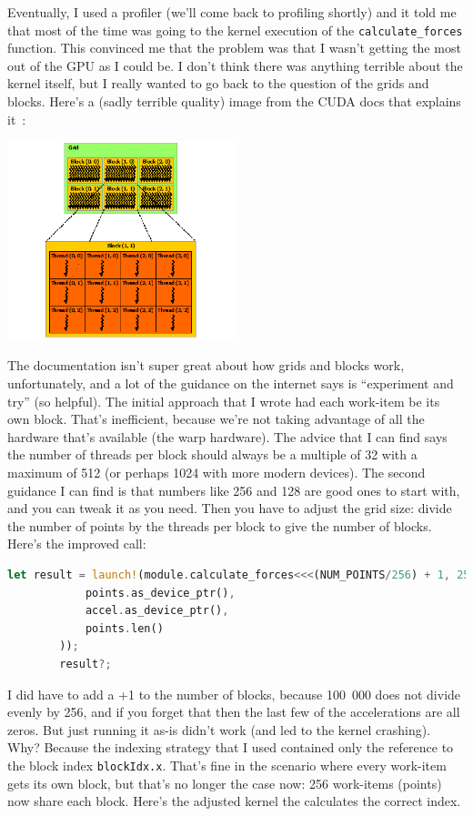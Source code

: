 \documentclass[a4paper]{report}
\begin{document}
Eventually, I used a profiler (we'll come back to profiling shortly) and it told me that most of the time was going to the kernel execution of the \texttt{calculate\_forces} function. This convinced me that the problem was that I wasn't getting the most out of the GPU as I could be. I don't think there was anything terrible about the kernel itself, but I really wanted to go back to the question of the grids and blocks. Here's a (sadly terrible quality) image from the CUDA docs that explains it~\cite{cuda}:
\begin{center}
	\includegraphics[width=0.5\textwidth]{images/grid-of-thread-blocks.png}
\end{center}

The documentation isn't super great about how grids and blocks work, unfortunately, and a lot of the guidance on the internet says is ``experiment and try'' (so helpful). The initial approach that I wrote had each work-item be its own block. That's inefficient, because we're not taking advantage of all the hardware that's available (the warp hardware). The advice that I can find says the number of threads per block should always be a multiple of 32 with a maximum of 512 (or perhaps 1024 with more modern devices). The second guidance I can find is that numbers like 256 and 128 are good ones to start with, and you can tweak it as you need. Then you have to adjust the grid size: divide the number of points by the threads per block to give the number of blocks. Here's the improved call:

\begin{lstlisting}[language=Rust]
        let result = launch!(module.calculate_forces<<<(NUM_POINTS/256) + 1, 256, 0, stream>>>(
            points.as_device_ptr(),
            accel.as_device_ptr(),
            points.len()
        ));
        result?;
\end{lstlisting}

I did have to add a +1 to the number of blocks, because 100~000 does not divide evenly by 256, and if you forget that then the last few of the accelerations are all zeros. But just running it as-is didn't work (and led to the kernel crashing). Why? Because the indexing strategy that I used contained only the reference to the block index \texttt{blockIdx.x}. That's fine in the scenario where every work-item gets its own block, but that's no longer the case now: 256 work-items (points) now share each block. Here's the adjusted kernel the calculates the correct index. 
\end{document}
